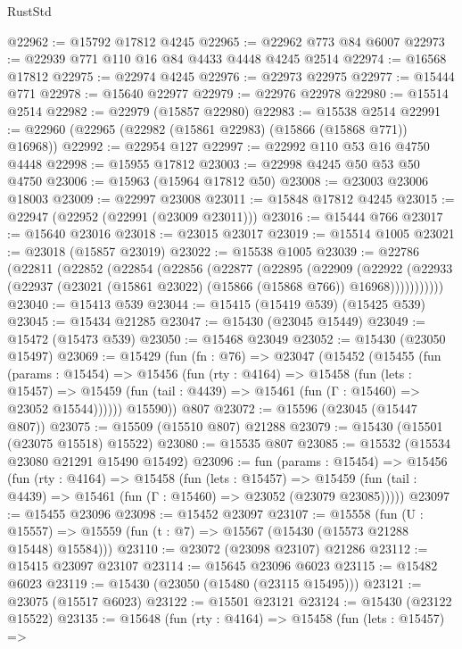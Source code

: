\begin{lexlean}{RustStd}
\begin{coremodule}
{\begin{coremodule}
{{{{{{{{{{{{{{{{{{{{{{{{{{{{{{{{{{{{{{{{{{{{{{{{{{{{{{{{{{{{@22962 := @15792 @17812 @4245
@22965 := @22962 @773 @84 @6007
@22973 := @22939 @771 @110 @16 @84 @4433 @4448 @4245 @2514
@22974 := @16568 @17812
@22975 := @22974 @4245
@22976 := @22973 @22975
@22977 := @15444 @771
@22978 := @15640 @22977
@22979 := @22976 @22978
@22980 := @15514 @2514
@22982 := @22979 (@15857 @22980)
@22983 := @15538 @2514
@22991 := @22960 (@22965 (@22982 (@15861 @22983) (@15866 (@15868 @771)) @16968))
@22992 := @22954 @127
@22997 := @22992 @110 @53 @16 @4750 @4448
@22998 := @15955 @17812
@23003 := @22998 @4245 @50 @53 @50 @4750
@23006 := @15963 (@15964 @17812 @50)
@23008 := @23003 @23006 @18003
@23009 := @22997 @23008
@23011 := @15848 @17812 @4245
@23015 := @22947 (@22952 (@22991 (@23009 @23011)))
@23016 := @15444 @766
@23017 := @15640 @23016
@23018 := @23015 @23017
@23019 := @15514 @1005
@23021 := @23018 (@15857 @23019)
@23022 := @15538 @1005
@23039 := @22786
    (@22811
      (@22852
        (@22854
          (@22856
            (@22877
              (@22895
                (@22909
                  (@22922
                    (@22933 (@22937 (@23021 (@15861 @23022) (@15866 (@15868 @766)) @16968)))))))))))
@23040 := @15413 @539
@23044 := @15415 (@15419 @539) (@15425 @539)
@23045 := @15434 @21285
@23047 := @15430 (@23045 @15449)
@23049 := @15472 (@15473 @539)
@23050 := @15468 @23049
@23052 := @15430 (@23050 @15497)
@23069 := @15429
    (fun (fn : @76) =>
    @23047
      (@15452
        (@15455
          (fun (params : @15454) =>
          @15456
            (fun (rty : @4164) =>
            @15458
              (fun (lets : @15457) =>
              @15459 (fun (tail : @4439) => @15461 (fun (Γ : @15460) => @23052 @15544))))))
        @15590))
    @807
@23072 := @15596 (@23045 (@15447 @807))
@23075 := @15509 (@15510 @807) @21288
@23079 := @15430 (@15501 (@23075 @15518) @15522)
@23080 := @15535 @807
@23085 := @15532 (@15534 @23080 @21291 @15490 @15492)
@23096 := fun (params : @15454) =>
  @15456
    (fun (rty : @4164) =>
    @15458
      (fun (lets : @15457) =>
      @15459 (fun (tail : @4439) => @15461 (fun (Γ : @15460) => @23052 (@23079 @23085)))))
@23097 := @15455 @23096
@23098 := @15452 @23097
@23107 := @15558
    (fun (U : @15557) => @15559 (fun (t : @7) => @15567 (@15430 (@15573 @21288 @15448) @15584)))
@23110 := @23072 (@23098 @23107) @21286
@23112 := @15415 @23097 @23107
@23114 := @15645 @23096 @6023
@23115 := @15482 @6023
@23119 := @15430 (@23050 (@15480 (@23115 @15495)))
@23121 := @23075 (@15517 @6023)
@23122 := @15501 @23121
@23124 := @15430 (@23122 @15522)
@23135 := @15648
    (fun (rty : @4164) =>
    @15458
      (fun (lets : @15457) =>
}}}}}}}}}}}}}}}}}}}}}}}}}}}}}}}}}}}}}}}}}}}}}}}}}}}}}}}}}}}}
\end{coremodule}}
\end{coremodule}
\end{lexlean}
